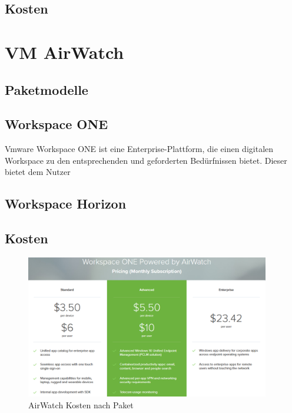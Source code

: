\subsection{Kosten}

\newpage

\section{VM AirWatch}
\subsection{Paketmodelle}


\subsection{Workspace ONE}
Vmware Workspace ONE ist eine Enterprise-Plattform, die einen digitalen Workspace zu den entsprechenden und geforderten Bedürfnissen bietet. Dieser bietet dem Nutzer 

\subsection{Workspace Horizon}

\subsection{Kosten}
\begin{figure}[hbt]
\centering
\includegraphics[width=0.95\textwidth]{Bilder/aw_1.png} 
\caption{AirWatch Kosten nach Paket}\label{fig:AirWat1}
\end{figure}























